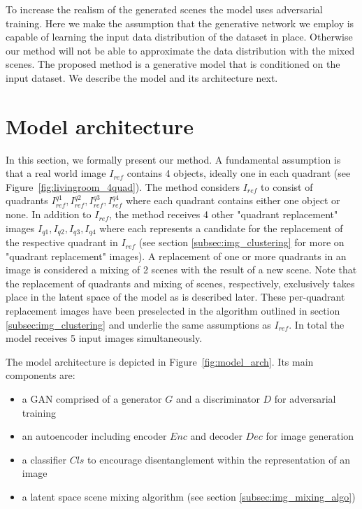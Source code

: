 \documentclass[a4paper,12pt]{report}
\begin{document}
To increase the realism of the generated scenes the model uses adversarial training. Here we make the assumption that the generative network we employ is capable of learning the input data distribution of the dataset in place. Otherwise our method will not be able to approximate the data distribution with the mixed scenes. The proposed method is a generative model that is conditioned on the input dataset. We describe the model and its architecture next.


\section{Model architecture}\label{subsec:model_arch}
In this section, we formally present our method. A fundamental assumption is that a real world image $I_{ref}$ contains 4 objects, ideally one in each quadrant (see Figure~\ref{fig:livingroom_4quad}). The method considers $I_{ref}$ to consist of quadrants $I^{q1}_{ref}, I^{q2}_{ref}, I^{q3}_{ref}, I^{q4}_{ref}$ where each quadrant contains either one object or none. In addition to $I_{ref}$, the method receives 4 other "quadrant replacement" images $I_{q1},I_{q2},I_{q3},I_{q4}$ where each represents a candidate for the replacement of the respective quadrant in $I_{ref}$ (see section \ref{subsec:img_clustering} for more on "quadrant replacement" images). A replacement of one or more quadrants in an image is considered a mixing of 2 scenes with the result of a new scene. Note that the replacement of quadrants and mixing of scenes, respectively, exclusively takes place in the latent space of the model as is described later. These per-quadrant replacement images have been preselected in the algorithm outlined in section \ref{subsec:img_clustering} and underlie the same assumptions as $I_{ref}$. In total the model receives 5 input images simultaneously.

The model architecture is depicted in Figure~\ref{fig:model_arch}. Its main components are:

\begin{itemize}
   \item a GAN comprised of a generator $G$ and a discriminator $D$ for adversarial training
   \item an autoencoder including encoder $Enc$ and decoder $Dec$ for image generation
   \item a classifier $Cls$ to encourage disentanglement within the representation of an image
   \item a latent space scene mixing algorithm (see section \ref{subsec:img_mixing_algo})
\end{itemize}
 
\end{document}
